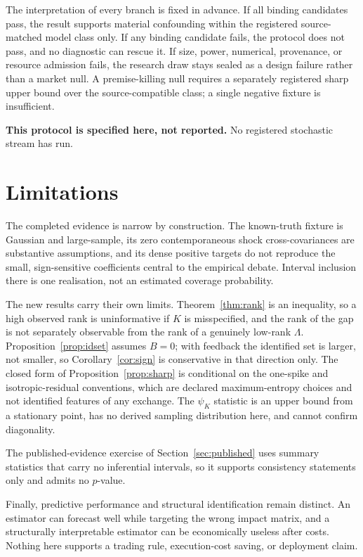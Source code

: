 \documentclass[10pt,twocolumn]{article}
\theoremstyle{remark}
\begin{document}
The interpretation of every branch is fixed in advance. If all binding
candidates pass, the result supports material confounding within the registered
source-matched model class only. If any binding candidate fails, the protocol
does not pass, and no diagnostic can rescue it. If size, power, numerical,
provenance, or resource admission fails, the research draw stays sealed as a
design failure rather than a market null. A premise-killing null requires a
separately registered sharp upper bound over the source-compatible class; a
single negative fixture is insufficient.

\textbf{This protocol is specified here, not reported.} No registered
stochastic stream has run.

\section{Limitations}

The completed evidence is narrow by construction. The known-truth fixture is
Gaussian and large-sample, its zero contemporaneous shock cross-covariances are
substantive assumptions, and its dense positive targets do not reproduce the
small, sign-sensitive coefficients central to the empirical debate. Interval
inclusion there is one realisation, not an estimated coverage probability.

The new results carry their own limits. Theorem~\ref{thm:rank} is an
inequality, so a high observed rank is uninformative if $K$ is misspecified,
and the rank of the gap is not separately observable from the rank of a
genuinely low-rank $\Lambda$. Proposition~\ref{prop:idset} assumes $B=0$; with
feedback the identified set is larger, not smaller, so
Corollary~\ref{cor:sign} is conservative in that direction only. The closed
form of Proposition~\ref{prop:sharp} is conditional on the one-spike and
isotropic-residual conventions, which are declared maximum-entropy choices and
not identified features of any exchange. The $\psi_K$ statistic is an upper
bound from a stationary point, has no derived sampling distribution here, and
cannot confirm diagonality.

The published-evidence exercise of Section~\ref{sec:published} uses summary
statistics that carry no inferential intervals, so it supports consistency
statements only and admits no $p$-value.

Finally, predictive performance and structural identification remain distinct.
An estimator can forecast well while targeting the wrong impact matrix, and a
structurally interpretable estimator can be economically useless after costs.
Nothing here supports a trading rule, execution-cost saving, or deployment
claim.
\end{document}
